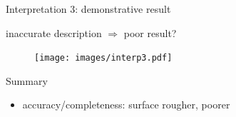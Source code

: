 \documentclass[10pt]{beamer}
\begin{document}
\begin{frame}{Interpretation 3: demonstrative result}

inaccurate description $\Rightarrow$ poor result?

\begin{figure}
\centering
\texttt{[image: images/interp3.pdf]}
\end{figure}

\begin{exampleblock}{Summary}
\begin{itemize}
\item accuracy/completeness: surface rougher, poorer
\end{itemize}
\end{exampleblock}

\end{frame}
\end{document}

